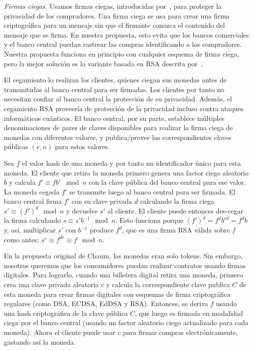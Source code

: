\documentclass[a4paper,10pt]{article} %
\begin{document}
\emph{Firmas ciegas.} Usamos firmas ciegas, introducidas
por~\citet{Chaum1983}, para proteger la privacidad de los compradores. Una
firma ciega se usa para crear una firma criptográfica para un mensaje sin que
el firmante conozca el contenido del mensaje que se firma. En nuestra
propuesta, esto evita que los bancos comerciales y el banco central puedan
rastrear las compras identificando a los compradores. Nuestra propuesta
funciona en principio con cualquier esquema de firma ciega, pero la mejor
solución es la variante basada en RSA descrita por~\citet{Chaum1983}.

El cegamiento lo realizan los clientes, quienes ciegan sus monedas antes
de transmitirlas al banco central para ser firmadas. Los clientes por
tanto no necesitan confiar al banco central la protección de su
privacidad. Además, el cegamiento RSA proveería de protección de la
privacidad incluso contra ataques informáticos cuánticos. El banco
central, por su parte, establece múltiples denominaciones de pares de
claves disponibles para realizar la firma ciega de monedas con
diferentes valores, y publica/provee las correspondientes claves
públicas $(e, n)$ para estos valores.

Sea $f$ el valor hash de una moneda y por tanto un identificador único
para esta moneda. El cliente que retira la moneda primero genera una
factor ciego aleatorio $b$ y calcula
$f' \equiv fb^{e} \mod n$
con la clave pública del banco central para ese valor.
La moneda cegada $f'$ se transmite luego
al banco central para ser firmada. El banco central firma $f'$ con su
clave privada $d$ calculando la firma ciega
$s' \equiv \left(f' \right)^{d} \mod n$ y devuelve
$s'$ al cliente.
El cliente puede entonces des-cegar la firma calculando
$s \equiv s'b^{- 1} \mod n$.
Esto funciona porque
$\left( f' \right)^d = f^db^{ed} = f^db$ y, así,
multiplicar $s'$ con $b^{- 1}$ produce $f^d$, que es una firma RSA
válida sobre $f$ como antes:
$s^e \equiv f^{de} \equiv f \mod n$.

En la propuesta original de Chaum, las monedas eran solo tokens. Sin
embargo, nosotros queremos que los consumidores puedan realizar
contratos usando firmas digitales. Para lograrlo, cuando una billetera
digital retira una moneda, primero crea una clave privada aleatoria
$c$ y calcula la correspondiente clave publica $C$ de esta moneda
para crear firmas digitales con esquemas de firma criptográfica
regulares (como DSA, ECDSA, EdDSA y RSA). Entonces, se deriva $f$
usando una hash criptográfica de la clave pública $C$, que luego es
firmada en modalidad ciega por el banco central (usando un factor
aleatorio ciego actualizado para cada moneda). Ahora el cliente puede
usar $c$ para firmar compras electrónicamente, gastando así la moneda.
\end{document}
